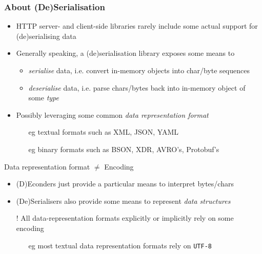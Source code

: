 \documentclass[presentation]{beamer}\mode<presentation>{\usetheme{AMSCesenaPurpleAndGold}}
\begin{document}
\begin{frame}%
\frametitle{About (De)Serialisation}

    \begin{itemize}
        \item HTTP server- and client-side libraries rarely include some actual support for (de)serialising data

        \vfill

        \item Generally speaking, a (de)serialisation library exposes some means to
        \begin{itemize}
            \item \emph{serialise} data, i.e. convert  in-memory objects into char/byte sequences

            \item \emph{deserialise} data, i.e. parse chars/bytes back into in-memory object of some \emph{type}
        \end{itemize}

        \vfill

        \item Possibly leveraging some common \emph{data representation format}
        \begin{itemize}
            \item[eg] textual formats such as XML, JSON, YAML
            \item[eg] binary formats such as BSON, XDR, AVRO's, Protobuf's
        \end{itemize}
    \end{itemize}

    \vfill

    \begin{block}{Data representation format $\neq$ Encoding}\small
        \begin{itemize}
            \item (D)Econders just provide a particular means to interpret bytes/chars
            \item (De)Serialisers also provide some means to represent \emph{data structures}

            \item[!] All data-representation formats explicitly or implicitly rely on some encoding
            \begin{itemize}
                \item[eg] most textual data representation formats rely on \texttt{UTF-8}
            \end{itemize}
        \end{itemize}
    \end{block}

\end{frame}
\end{document}
